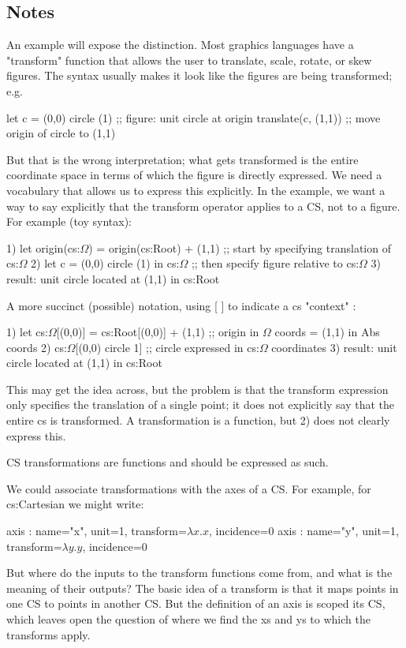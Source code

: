 \documentclass[reqno,12pt]{tufte-handout}
\numberwithin{equation}{subsection}
\numberwithin{equation}{subsection}
\begin{document}
  \subsection{Notes}

  An example will expose the distinction.  Most graphics languages have
  a "transform" function that allows the user to translate, scale,
  rotate, or skew figures.  The syntax usually makes it look like the
  figures are being transformed; e.g.

  let c = (0,0) circle (1)  ;; figure: unit circle at origin
  translate(c, (1,1))	      ;; move origin of circle to (1,1)

  But that is the wrong interpretation; what gets transformed is the
  entire coordinate space in terms of which the figure is directly
  expressed.  We need a vocabulary that allows us to express this
  explicitly.  In the example, we want a way to say explicitly that the
  transform operator applies to a CS, not to a figure.  For example (toy syntax):

  1)	  let origin(cs:$\Omega$) = origin(cs:Root) + (1,1)  ;; start by specifying translation of cs:$\Omega$
  2)	  let c = (0,0) circle (1) in cs:$\Omega$  ;; then specify figure relative to cs:$\Omega$
  3)	  result: unit circle located at (1,1) in cs:Root

  A more succinct (possible) notation, using [ ] to indicate a cs "context" :

  1)	  let cs:$\Omega$[(0,0)] = cs:Root[(0,0)] + (1,1)  ;; origin in $\Omega$ coords = (1,1) in Abs coords
  2)	  cs:$\Omega$[(0,0) circle 1]   ;; circle expressed in cs:$\Omega$ coordinates
  3)	  result: unit circle located at (1,1) in cs:Root

  This may get the idea across, but the problem is that the transform
  expression only specifies the translation of a single point; it does
  not explicitly say that the entire cs is transformed.  A
  transformation is a function, but 2) does not clearly express this.

  CS transformations are functions and should be expressed as such.

  We could associate transformations with the axes of a CS.  For
  example, for cs:Cartesian we might write:

  axis : {name="x", unit=1, transform=\(\lambda x.x\), incidence=0}
  axis : {name="y", unit=1, transform=\(\lambda y.y\), incidence=0}

  But where do the inputs to the transform functions come from, and what
  is the meaning of their outputs?  The basic idea of a transform is
  that it maps points in one CS to points in another CS.  But the
  definition of an axis is scoped its CS, which leaves open the question
  of where we find the xs and ys to which the transforms apply.
\end{document}
